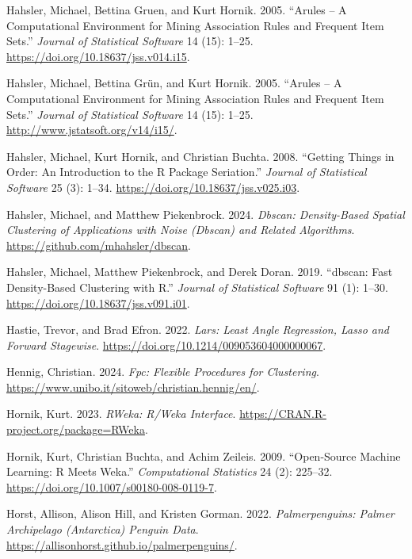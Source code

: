 \documentclass[
  notitlepage]{book}
\newlength{\cslhangindent}
\newenvironment{cslreferences}%
  {\setlength{\parindent}{0pt}%
  \everypar{\setlength{\hangindent}{\cslhangindent}}\ignorespaces}%
  {\par}
\begin{document}
\begin{cslreferences}
\leavevmode\hypertarget{ref-arules2005}{}%
Hahsler, Michael, Bettina Gruen, and Kurt Hornik. 2005. ``Arules -- A Computational Environment for Mining Association Rules and Frequent Item Sets.'' \emph{Journal of Statistical Software} 14 (15): 1--25. \url{https://doi.org/10.18637/jss.v014.i15}.

\leavevmode\hypertarget{ref-arules:Hahsler+Gruen+Hornik:2005b}{}%
Hahsler, Michael, Bettina Grün, and Kurt Hornik. 2005. ``Arules -- A Computational Environment for Mining Association Rules and Frequent Item Sets.'' \emph{Journal of Statistical Software} 14 (15): 1--25. \url{http://www.jstatsoft.org/v14/i15/}.

\leavevmode\hypertarget{ref-seriation2008}{}%
Hahsler, Michael, Kurt Hornik, and Christian Buchta. 2008. ``Getting Things in Order: An Introduction to the R Package Seriation.'' \emph{Journal of Statistical Software} 25 (3): 1--34. \url{https://doi.org/10.18637/jss.v025.i03}.

\leavevmode\hypertarget{ref-R-dbscan}{}%
Hahsler, Michael, and Matthew Piekenbrock. 2024. \emph{Dbscan: Density-Based Spatial Clustering of Applications with Noise (Dbscan) and Related Algorithms}. \url{https://github.com/mhahsler/dbscan}.

\leavevmode\hypertarget{ref-dbscan2019}{}%
Hahsler, Michael, Matthew Piekenbrock, and Derek Doran. 2019. ``dbscan: Fast Density-Based Clustering with R.'' \emph{Journal of Statistical Software} 91 (1): 1--30. \url{https://doi.org/10.18637/jss.v091.i01}.

\leavevmode\hypertarget{ref-R-lars}{}%
Hastie, Trevor, and Brad Efron. 2022. \emph{Lars: Least Angle Regression, Lasso and Forward Stagewise}. \url{https://doi.org/10.1214/009053604000000067}.

\leavevmode\hypertarget{ref-R-fpc}{}%
Hennig, Christian. 2024. \emph{Fpc: Flexible Procedures for Clustering}. \url{https://www.unibo.it/sitoweb/christian.hennig/en/}.

\leavevmode\hypertarget{ref-R-RWeka}{}%
Hornik, Kurt. 2023. \emph{RWeka: R/Weka Interface}. \url{https://CRAN.R-project.org/package=RWeka}.

\leavevmode\hypertarget{ref-RWeka2009}{}%
Hornik, Kurt, Christian Buchta, and Achim Zeileis. 2009. ``Open-Source Machine Learning: R Meets Weka.'' \emph{Computational Statistics} 24 (2): 225--32. \url{https://doi.org/10.1007/s00180-008-0119-7}.

\leavevmode\hypertarget{ref-R-palmerpenguins}{}%
Horst, Allison, Alison Hill, and Kristen Gorman. 2022. \emph{Palmerpenguins: Palmer Archipelago (Antarctica) Penguin Data}. \url{https://allisonhorst.github.io/palmerpenguins/}.


\end{cslreferences}
\end{document}
